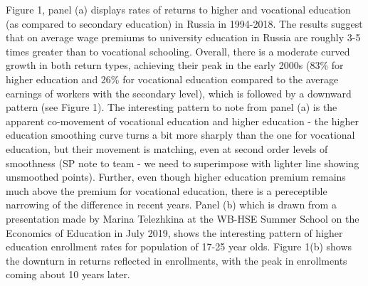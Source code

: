 \documentclass[12pt,a4paper]{article}
\begin{document}
Figure 1, panel (a) displays rates of returns to higher and vocational education (as compared to secondary education) in Russia in 1994-2018. The results suggest that on average wage premiums to university education in Russia are roughly 3-5 times greater than to vocational schooling. Overall, there is a moderate curved growth in both return types, achieving their peak in the early 2000s (83\% for higher education and 26\% for vocational education compared to the average earnings of workers with the secondary level), which is followed by a downward pattern (see Figure 1). The interesting pattern to note from panel (a) is the apparent co-movement of vocational education and higher education - the higher education smoothing curve turns a bit more sharply than the one for vocational education, but their movement is matching, even at second order levels of smoothness (SP note to team - we need to superimpose with lighter line showing unsmoothed points). Further, even though higher education premium remains much above the premium for vocational education, there is a pereceptible narrowing of the difference in recent years. Panel (b) which is drawn from a presentation made by Marina Telezhkina at the WB-HSE Summer School on the Economics of Education in July 2019, shows the interesting pattern of higher education enrollment rates for population of 17-25 year olds. Figure 1(b) shows the downturn in returns reflected in enrollments, with the peak in enrollments coming about 10 years later. 
\\
\end{document}
